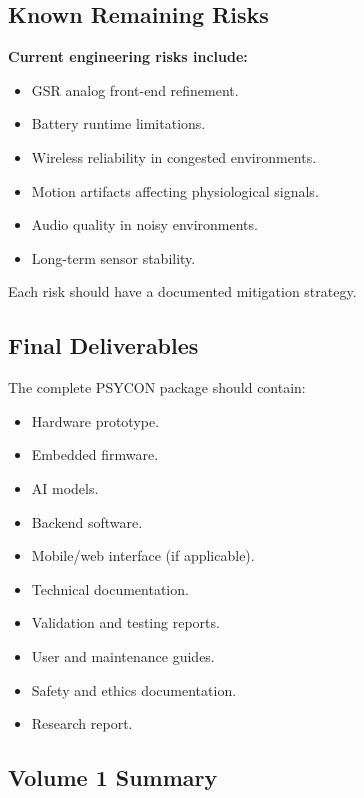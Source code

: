 \subsection{Known Remaining Risks}
\label{sec:known-remaining-risks-ch8}

\begin{observationbox}
\textbf{Current engineering risks include:}
\begin{itemize}
    \item GSR analog front-end refinement.
    \item Battery runtime limitations.
    \item Wireless reliability in congested environments.
    \item Motion artifacts affecting physiological signals.
    \item Audio quality in noisy environments.
    \item Long-term sensor stability.
\end{itemize}
Each risk should have a documented mitigation strategy.
\end{observationbox}

\subsection{Final Deliverables}
\label{sec:final-deliverables}

The complete PSYCON package should contain:
\begin{itemize}
    \item Hardware prototype.
    \item Embedded firmware.
    \item AI models.
    \item Backend software.
    \item Mobile/web interface (if applicable).
    \item Technical documentation.
    \item Validation and testing reports.
    \item User and maintenance guides.
    \item Safety and ethics documentation.
    \item Research report.
\end{itemize}

\subsection{Volume 1 Summary}
\label{sec:volume1-summary}

